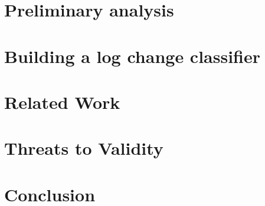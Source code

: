 %

\section{Preliminary analysis}

\label{analysis}



\section{Building a log change classifier}
%
\label{prediction}




\section{Related Work }
\label{related}


\section{Threats to Validity}
\label{threats}


\section{Conclusion}
\label{conc}










